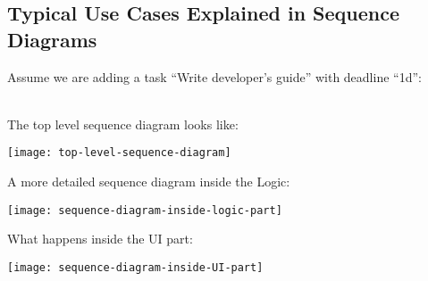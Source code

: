 \documentclass[12pt, a4paper]{article}
\begin{document}
\subsection{Typical Use Cases Explained in Sequence Diagrams}
Assume we are adding a task ``Write developer’s guide'' with deadline ``1d'':

\\The top level sequence diagram looks like:
\begin{center}
  \texttt{[image: top-level-sequence-diagram]}
\end{center}

A more detailed sequence diagram inside the Logic:
\begin{center}
  \texttt{[image: sequence-diagram-inside-logic-part]}
\end{center}

What happens inside the UI part:
\begin{center}
  \texttt{[image: sequence-diagram-inside-UI-part]}
\end{center}
\end{document}
